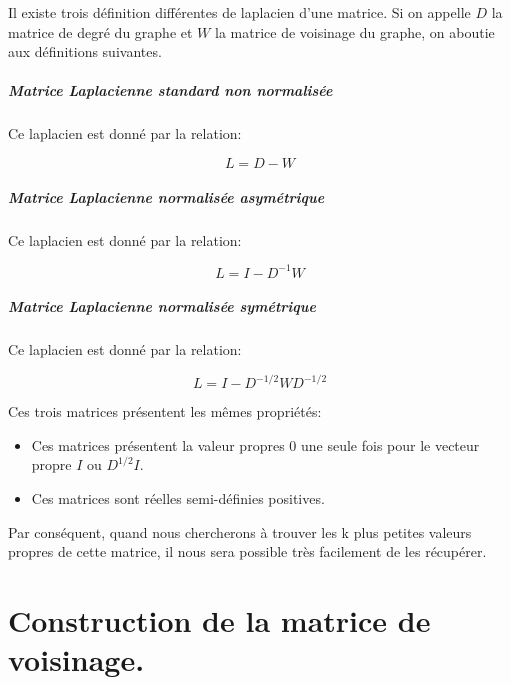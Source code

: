 Il existe trois définition différentes de laplacien d'une matrice. Si on appelle $D$ la matrice de degré du graphe et $W$ la matrice de voisinage du graphe, on aboutie aux définitions suivantes.

\paragraph{Matrice Laplacienne standard non normalisée}

\medskip 

Ce laplacien est donné par la relation:

\begin{equation}
L = D-W
\end{equation}


\paragraph{Matrice Laplacienne normalisée asymétrique}

\medskip 

Ce laplacien est donné par la relation:

\begin{equation}
L = I-D^{-1}W
\end{equation}


\paragraph{Matrice Laplacienne normalisée symétrique}

\medskip 

Ce laplacien est donné par la relation:

\begin{equation}
L = I-D^{-1/2}WD^{-1/2}
\end{equation}

Ces trois matrices présentent les mêmes propriétés:

\begin{itemize}
\item Ces matrices présentent la valeur propres 0 une seule fois pour le vecteur propre $I$ ou $D^{1/2}I$.
\item Ces matrices sont réelles semi-définies positives.
\end{itemize}

Par conséquent, quand nous chercherons à trouver les k plus petites valeurs propres de cette matrice, il nous sera possible très facilement de les récupérer.

\chapter{Construction de la matrice de voisinage.}


